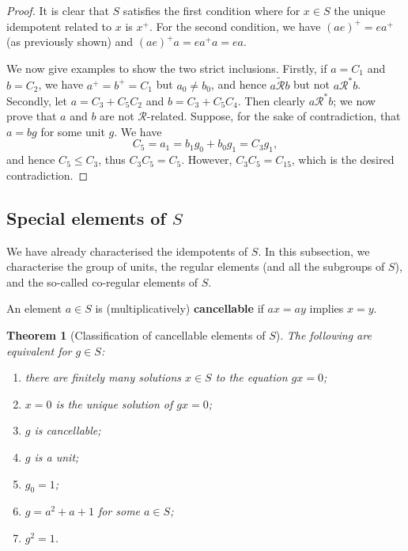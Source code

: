 \documentclass[a4paper, 11pt]{article}
\theoremstyle{plain}
\newtheorem{theorem}{Theorem}[section]
\theoremstyle{definition}
\newcommand{\Define}    [1] {\textbf{#1}}
\begin{document}
\begin{proof}
It is clear that $S$ satisfies the first condition where for $x \in S$ the unique idempotent related to $x$ is $x^+$. For the second condition, we have $(ae)^+ = e a^+$ (as previously shown) and $(ae)^+ a = e a^+ a = e a$. 

We now give examples to show the two strict inclusions. Firstly, if $a = C_1$ and $b = C_2$, we have $a^+ = b^+ = C_1$ but $a_0 \ne b_0$, and hence $a \tilde{\mathcal{R}} b$ but not $a \mathcal{R}^* b$. Secondly, let $a = C_3 + C_5 C_2$ and $b = C_3 + C_5 C_4$. Then clearly $a \mathcal{R}^* b$; we now prove that $a$ and $b$ are not $\mathcal{R}$-related. Suppose, for the sake of contradiction, that $a = bg$ for some unit $g$. We have 
\[
    C_5 = a_1 = b_1 g_0 + b_0 g_1 = C_3 g_1,
\]
and hence $C_5 \le C_3$, thus $C_3C_5 = C_5$. However, $C_3C_5 = C_{15}$, which is the desired contradiction.
\end{proof}





\subsection{Special elements of $S$} \label{subsection:special_elements}

We have already characterised the idempotents of $S$. In this subsection, we characterise the group of units, the regular elements (and all the subgroups of $S$), and the so-called co-regular elements of $S$.

An element $a \in S$ is (multiplicatively) \Define{cancellable} if $ax = ay$ implies $x = y$.


\begin{theorem}[Classification of cancellable elements of $S$] \label{theorem:cancellable_elements}
The following are equivalent for $g \in S$:
    \begin{enumerate}
        \item \label{item:finite_number_gx=0} there are finitely many solutions $x \in S$ to the equation $gx = 0$;

        \item \label{item:unique_gx=0} $x = 0$ is the unique solution of $gx = 0$;

        \item \label{item:g_cancellable} $g$ is cancellable;

        \item \label{item:g_unit} $g$ is a unit;

        \item \label{item:g0=1} $g_0 = 1$;

        \item \label{item:g=a2+a+1} $g = a^2 + a + 1$ for some $a \in S$;
        \item \label{item:order2}$g^2=1$.
    \end{enumerate}
\end{theorem}
\end{document}
